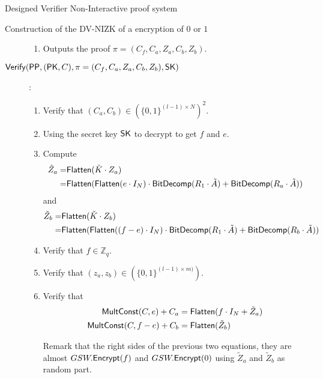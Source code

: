 \begin{section}{Designed Verifier Non-Interactive proof system}
\begin{subsection}{Construction of the DV-NIZK of a encryption of $0$ or $1$}
\begin{description}
\begin{enumerate}
        \item Outputs the proof $\pi = (C_f, C_a, Z_a, C_b, Z_b)$.
          

        \end{enumerate}

      \item[${\mathsf{Verify}}({\mathsf{PP}}, (\mathsf{PK}, C), \pi = (C_f, C_a, Z_a, C_b, Z_b), \mathsf{SK})$]:
        \begin{enumerate}
        \item Verify that $(C_a, C_b) \in (\{0,1\}^{(l-1) \times N})^2$.
        \item Using the secret key $\mathsf{SK}$ to decrypt to get $f$ and $e$.
        \item Compute
          \begin{align*}
            \tilde{Z}_a = & {\mathsf{Flatten}}(\tilde{K} \cdot Z_a)\\
            = &{\mathsf{Flatten}}({\mathsf{Flatten}}(e \cdot I_N) \cdot {\mathsf{BitDecomp}}(R_1 \cdot \tilde{A}) + {\mathsf{BitDecomp}}(R_a \cdot \tilde{A}))
          \end{align*}
          and
          \begin{align*}
            \tilde{Z}_b = & {\mathsf{Flatten}}(\tilde{K} \cdot Z_b)\\
            = &{\mathsf{Flatten}}({\mathsf{Flatten}}((f-e) \cdot I_N) \cdot {\mathsf{BitDecomp}}(R_1 \cdot \tilde{A}) + {\mathsf{BitDecomp}}(R_b \cdot \tilde{A}))
          \end{align*}

        \item Verify that $f \in \mathbb{Z}_q$.
        \item Verify that $(z_a, z_b) \in  (\{0,1\}^{(l-1) \times m)})$.
        \item Verify that
          \begin{align*}
            {\mathsf{MultConst}}(C, e) + C_a &= {\mathsf{Flatten}}(f \cdot I_N + \tilde{Z}_a)\\
            {\mathsf{MultConst}}(C, f-e) + C_b &= {\mathsf{Flatten}}(\tilde{Z}_b)
          \end{align*}

          Remark that the right sides of the previous two equations, they are almost $GSW.{\mathsf{Encrypt}}(f)$ and $GSW.{\mathsf{Encrypt}}(0)$ using $\tilde{Z}_a$ and $\tilde{Z}_b$ as random part.
        \end{enumerate}

        
        
    \end{description}


    
    

\end{subsection}
\end{section}
